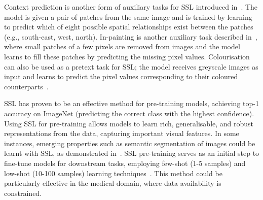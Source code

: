 Context prediction is another form of auxiliary tasks for SSL introduced in~\cite{Doersch2015UnsupervisedVR}. The model is given a pair of patches from the same image and is trained by learning to predict which of eight possible spatial relationships exist between the patches (e.g., south-east, west, north). In-painting is another auxiliary task described in~\cite{Pathak-2016}, where small patches of a few pixels are removed from images and the model learns to fill these patches by predicting the missing pixel values. Colourisation can also be used as a pretext task for SSL; the model receives greyscale images as input and learns to predict the pixel values corresponding to their coloured counterparts~\cite{Larsson2017ColorizationAA}.

SSL has proven to be an effective method for pre-training models, achieving top-1 accuracy on ImageNet (predicting the correct class with the highest confidence). Using SSL for pre-training allows models to learn rich, generalisable, and robust representations from the data, capturing important visual features. In some instances, emerging properties such as semantic segmentation of images could be learnt with SSL, as demonstrated in~\cite{caron-2021}. SSL pre-training serves as an initial step to fine-tune models for downstream tasks, employing few-shot (1-5 samples) and low-shot (10-100 samples) learning techniques~\cite{krenzer-2023}. This method could be particularly effective in the medical domain, where data availability is constrained. 

%
%
%